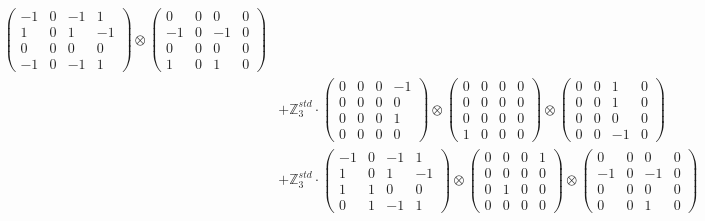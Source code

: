 \documentclass{article}
\begin{document}
{\begin{align}
            \begin{pmatrix} -1 & 0 & -1 & 1 \\ 1 & 0 & 1 & -1 \\ 0 & 0 & 0 & 0 \\ -1 & 0 & -1 & 1 \end{pmatrix} \otimes 
            \begin{pmatrix} 0 & 0 & 0 & 0 \\ -1 & 0 & -1 & 0 \\ 0 & 0 & 0 & 0 \\ 1 & 0 & 1 & 0 \end{pmatrix} \\ 
        &+ \label{Rs16-Rc11-Solution-17-c20} \mathbb{Z}_3^{std} \cdot 
            \begin{pmatrix} 0 & 0 & 0 & -1 \\ 0 & 0 & 0 & 0 \\ 0 & 0 & 0 & 1 \\ 0 & 0 & 0 & 0 \end{pmatrix} \otimes 
            \begin{pmatrix} 0 & 0 & 0 & 0 \\ 0 & 0 & 0 & 0 \\ 0 & 0 & 0 & 0 \\ 1 & 0 & 0 & 0 \end{pmatrix} \otimes 
            \begin{pmatrix} 0 & 0 & 1 & 0 \\ 0 & 0 & 1 & 0 \\ 0 & 0 & 0 & 0 \\ 0 & 0 & -1 & 0 \end{pmatrix} \\ 
        &+ \label{Rs16-Rc11-Solution-17-c21} \mathbb{Z}_3^{std} \cdot 
            \begin{pmatrix} -1 & 0 & -1 & 1 \\ 1 & 0 & 1 & -1 \\ 1 & 1 & 0 & 0 \\ 0 & 1 & -1 & 1 \end{pmatrix} \otimes 
            \begin{pmatrix} 0 & 0 & 0 & 1 \\ 0 & 0 & 0 & 0 \\ 0 & 1 & 0 & 0 \\ 0 & 0 & 0 & 0 \end{pmatrix} \otimes 
            \begin{pmatrix} 0 & 0 & 0 & 0 \\ -1 & 0 & -1 & 0 \\ 0 & 0 & 0 & 0 \\ 0 & 0 & 1 & 0 \end{pmatrix} \\ 

\end{align}}
\end{document}
